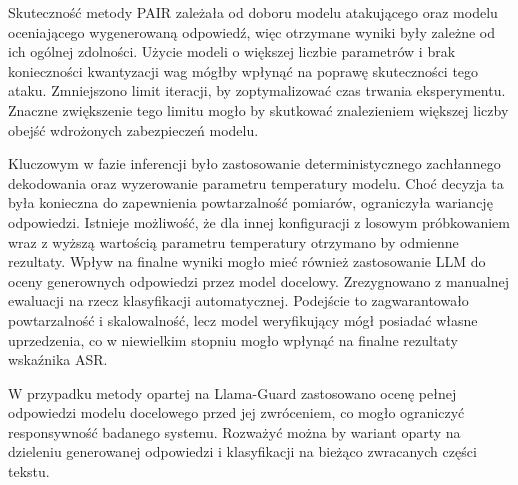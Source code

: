 Skuteczność metody \gls{PAIR} zależała od doboru modelu atakującego oraz modelu oceniającego wygenerowaną odpowiedź, więc otrzymane wyniki były zależne od ich ogólnej zdolności. Użycie modeli o większej liczbie parametrów i brak konieczności kwantyzacji wag mógłby wpłynąć na poprawę skuteczności tego ataku. Zmniejszono limit iteracji, by zoptymalizować czas trwania eksperymentu. Znaczne zwiększenie tego limitu mogło by skutkować znalezieniem większej liczby obejść wdrożonych zabezpieczeń modelu.

Kluczowym w fazie inferencji było zastosowanie deterministycznego zachłannego dekodowania oraz wyzerowanie parametru temperatury modelu. Choć decyzja ta była konieczna do zapewnienia powtarzalność pomiarów, ograniczyła wariancję odpowiedzi. Istnieje możliwość, że dla innej konfiguracji z losowym próbkowaniem wraz z wyższą wartością parametru temperatury otrzymano by odmienne rezultaty.
Wpływ na finalne wyniki mogło mieć również zastosowanie \gls{LLM} do oceny generownych odpowiedzi przez model docelowy. Zrezygnowano z manualnej ewaluacji na rzecz klasyfikacji automatycznej. Podejście to zagwarantowało powtarzalność i skalowalność, lecz model weryfikujący mógł posiadać własne uprzedzenia, co w niewielkim stopniu mogło wpłynąć na finalne rezultaty wskaźnika \gls{ASR}.

W przypadku metody opartej na Llama-Guard zastosowano ocenę pełnej odpowiedzi modelu docelowego przed jej zwróceniem, co mogło ograniczyć responsywność badanego systemu. Rozważyć można by wariant oparty na dzieleniu generowanej odpowiedzi i klasyfikacji na bieżąco zwracanych części tekstu.